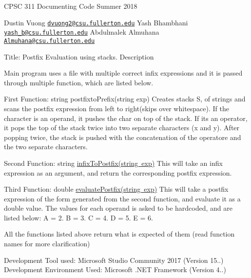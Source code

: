 C\+P\+SC 311 Documenting Code Summer 2018

Dustin Vuong \href{mailto:dvuong2@csu.fullerton.edu}{\tt dvuong2@csu.\+fullerton.\+edu} Yash Bhambhani \href{mailto:yash_b@csu.fullerton.edu}{\tt yash\+\_\+b@csu.\+fullerton.\+edu} Abdulmalek Almuhana \href{mailto:Almuhana@csu.fullerton.edu}{\tt Almuhana@csu.\+fullerton.\+edu}

Title\+: Postfix Evaluation using stacks. Description

Main program uses a file with multiple correct infix expressions and it is passed through multiple function, which are listed below.

First Function\+: string postfixto\+Prefix(string exp) Creates stacks S, of strings and scans the postfix expression from left to right(skips over whitespace). If the character is an operand, it pushes the char on top of the stack. If it\textquotesingle{}s an operator, it pops the top of the stack twice into two separate characters (x and y). After popping twice, the stack is pushed with the concatenation of the operatore and the two separate characters.

Second Function\+: string \mbox{\hyperlink{_project4_8cpp_af0507e1a6f4bf597b1526adb234f3e25}{infix\+To\+Postfix(string exp)}} This will take an infix expression as an argument, and return the corresponding postfix expression.

Third Function\+: double \mbox{\hyperlink{_project4_8cpp_a6c2bb4f5dffe3792e9522ddc4ed07a7d}{evaluate\+Postfix(string exp)}} This will take a postfix expression of the form generated from the second function, and evaluate it as a double value. The values for each operand is asked to be hardcoded, and are listed below\+: A = 2. B = 3. C = 4. D = 5. E = 6.

All the functions listed above return what is expected of them (read function names for more clarification)

Development Tool used\+: Microsoft Studio Community 2017 (Version 15..) Development Environment Used\+: Microsoft .N\+ET Framework (Version 4..) 
